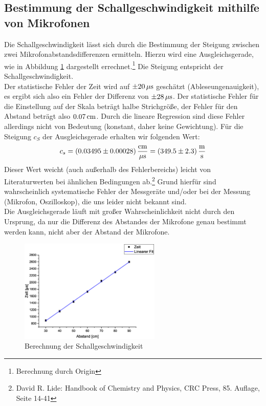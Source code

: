 \subsection{Bestimmung der Schallgeschwindigkeit mithilfe von Mikrofonen}
Die Schallgeschwindigkeit lässt sich durch die Bestimmung der Steigung zwischen zwei Mikrofonabstandsdifferenzen ermitteln. Hierzu wird eine Ausgleichsgerade, wie in Abbildung \ref{fig:aufgabe3} dargestellt errechnet.\footnote{Berechnung durch Origin} Die Steigung entspricht der Schallgeschwindigkeit.\\
Der statistische Fehler der Zeit wird auf $\pm \unit[20]{\mu s}$ geschätzt (Ableseungenauigkeit), es ergibt sich also ein Fehler der Differenz von $\pm \unit[28]{\mu s}$. Der statistische Fehler für die Einstellung auf der Skala beträgt halbe Strichgröße, der Fehler für den Abstand beträgt also $\unit[0.07]{cm}$. Durch die lineare Regression sind diese Fehler allerdings nicht von Bedeutung (konstant, daher keine Gewichtung). Für die Steigung $c_S$ der Ausgleichsgerade erhalten wir folgenden Wert:
\begin{equation}
c_s = \unit[(0.03495 \pm 0.00028)]{\frac{cm}{\mu s}} = \unit[(349.5 \pm 2.3)]{\frac{m}{s}}
\end{equation}
Dieser Wert weicht (auch außerhalb des Fehlerbereichs) leicht von Literaturwerten bei ähnlichen Bedingungen ab.\footnote{David R. Lide: Handbook of Chemistry and Physics, CRC Press, 85. Auflage, Seite 14-41}
Grund hierfür sind wahrscheinlich systematische Fehler der Messgeräte und/oder bei der Messung (Mikrofon, Oszilloskop), die uns leider nicht bekannt sind.\\
Die Ausgleichsgerade läuft mit großer Wahrscheinlichkeit nicht durch den Ursprung, da nur die Differenz des Abstandes der Mikrofone genau bestimmt werden kann, nicht aber der Abstand der Mikrofone.

\begin{figure}
\begin{center}
\includegraphics[width=0.6\textwidth]{Bilder/aufgabe3.eps}
\caption{Berechnung der Schallgeschwindigkeit}
\label{fig:aufgabe3}
\end{center}
\end{figure}